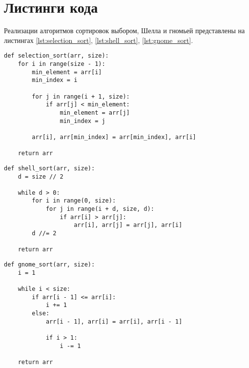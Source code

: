 \section{Листинги кода}

Реализации алгоритмов сортировок выбором, Шелла и гномьей представлены на листингах \ref{lst:selection_sort}, \ref{lst:shell_sort}, \ref{lst:gnome_sort}.

\begin{center}
\captionsetup{justification=raggedright,singlelinecheck=off}
\begin{lstlisting}[label=lst:selection_sort,caption=Алгоритм сортировки выбором]
def selection_sort(arr, size):
    for i in range(size - 1):
        min_element = arr[i]
        min_index = i

        for j in range(i + 1, size):
            if arr[j] < min_element:
                min_element = arr[j]
                min_index = j
        
        arr[i], arr[min_index] = arr[min_index], arr[i]

	return arr
\end{lstlisting} 
\end{center}

\begin{center}
\captionsetup{justification=raggedright,singlelinecheck=off}
\begin{lstlisting}[label=lst:shell_sort,caption=Алгоритм сортировки Шелла]
def shell_sort(arr, size):
    d = size // 2

    while d > 0:
        for i in range(0, size):
            for j in range(i + d, size, d):
                if arr[i] > arr[j]:
                    arr[i], arr[j] = arr[j], arr[i]
        d //= 2

	return arr
\end{lstlisting}
\end{center}

\begin{center}
\captionsetup{justification=raggedright,singlelinecheck=off}
\begin{lstlisting}[label=lst:gnome_sort,caption=Алгоритм гномьей сортировки]
def gnome_sort(arr, size):
    i = 1

    while i < size:
        if arr[i - 1] <= arr[i]:
            i += 1
        else:
            arr[i - 1], arr[i] = arr[i], arr[i - 1]

            if i > 1:
                i -= 1

	return arr
\end{lstlisting}
\end{center}

